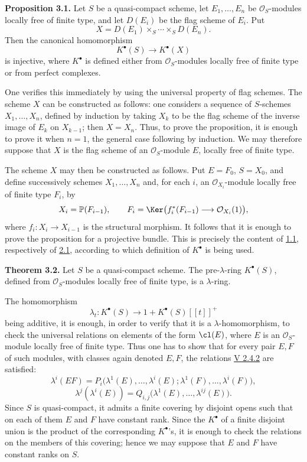 \textbf{Proposition 3.1.} Let \(S\) be a quasi-compact scheme, let \(E_1,\ldots,E_n\) be \(\mathcal O_S\)-modules locally free of finite type, and let \(D(E_i)\) be the flag scheme of \(E_i\). Put
\[
  X=D(E_1)\times_S\cdots\times_S D(E_n).
\]
Then the canonical homomorphism
\[
  K^\bullet(S)\longrightarrow K^\bullet(X)
\]
is injective, where \(K^\bullet\) is defined either from \(\mathcal O_S\)-modules locally free of finite type or from perfect complexes.

One verifies this immediately by using the universal property of flag schemes. The scheme \(X\) can be constructed as follows: one considers a sequence of \(S\)-schemes \(X_1,\ldots,X_n\), defined by induction by taking \(X_k\) to be the flag scheme of the inverse image of \(E_k\) on \(X_{k-1}\); then \(X=X_n\). Thus, to prove the proposition, it is enough to prove it when \(n=1\), the general case following by induction. We may therefore suppose that \(X\) is the flag scheme of an \(\mathcal O_S\)-module \(E\), locally free of finite type.

The scheme \(X\) may then be constructed as follows. Put \(E=F_0\), \(S=X_0\), and define successively schemes \(X_1,\ldots,X_n\) and, for each \(i\), an \(\mathcal O_{X_i}\)-module locally free of finite type \(F_i\), by
\[
  X_i=\mathbb P(F_{i-1}),\qquad
  F_i=\Ker\bigl(f_i^*(F_{i-1})\longrightarrow \mathcal O_{X_i}(1)\bigr),
\]
where \(f_i:X_i\to X_{i-1}\) is the structural morphism. It follows that it is enough to prove the proposition for a projective bundle. This is precisely the content of \hyperlink{sga6.e06.thm.1-1}{1.1}, respectively of \hyperlink{sga6.e06.thm.2-1}{2.1}, according to which definition of \(K^\bullet\) is being used.

\textbf{Theorem 3.2.} Let \(S\) be a quasi-compact scheme. The pre-\(\lambda\)-ring \(K^\bullet(S)\), defined from \(\mathcal O_S\)-modules locally free of finite type, is a \(\lambda\)-ring.

The homomorphism
\[
  \lambda_t:K^\bullet(S)\longrightarrow 1+K^\bullet(S)[[t]]^+
\]
being additive, it is enough, in order to verify that it is a \(\lambda\)-homomorphism, to check the universal relations on elements of the form \(\cl(E)\), where \(E\) is an \(\mathcal O_S\)-module locally free of finite type. Thus one has to show that for every pair \(E,F\) of such modules, with classes again denoted \(E,F\), the relations \hyperlink{sga6.e05.eq.2-4-2}{V 2.4.2} are satisfied:
\[
  \lambda^i(EF)=P_i\bigl(\lambda^1(E),\ldots,\lambda^i(E);\lambda^1(F),\ldots,\lambda^i(F)\bigr),
\]
\[
  \lambda^j(\lambda^i(E))=Q_{i,j}\bigl(\lambda^1(E),\ldots,\lambda^{ij}(E)\bigr).
\]
Since \(S\) is quasi-compact, it admits a finite covering by disjoint opens such that on each of them \(E\) and \(F\) have constant rank. Since the \(K^\bullet\) of a finite disjoint union is the product of the corresponding \(K^\bullet\)'s, it is enough to check the relations on the members of this covering; hence we may suppose that \(E\) and \(F\) have constant ranks on \(S\).

